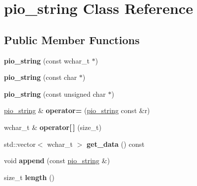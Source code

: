 \hypertarget{classpio__string}{
\section{pio\_\-string Class Reference}
\label{classpio__string}
}
\subsection*{Public Member Functions}
\begin{DoxyCompactItemize}
\item 
\hypertarget{classpio__string_a9bd0f5f40db3f65faf17078584dfc7c0}{
{\bfseries pio\_\-string} (const wchar\_\-t $\ast$)}
\label{classpio__string_a9bd0f5f40db3f65faf17078584dfc7c0}

\item 
\hypertarget{classpio__string_a421efc512a30212f57d3255b199b0436}{
{\bfseries pio\_\-string} (const char $\ast$)}
\label{classpio__string_a421efc512a30212f57d3255b199b0436}

\item 
\hypertarget{classpio__string_ab72437ecfba5b07f3d429adf3f4af999}{
{\bfseries pio\_\-string} (const unsigned char $\ast$)}
\label{classpio__string_ab72437ecfba5b07f3d429adf3f4af999}

\item 
\hypertarget{classpio__string_a22cee63eb6600e417145545ca2c9a62b}{
\hyperlink{classpio__string}{pio\_\-string} \& {\bfseries operator=} (\hyperlink{classpio__string}{pio\_\-string} const \&r)}
\label{classpio__string_a22cee63eb6600e417145545ca2c9a62b}

\item 
\hypertarget{classpio__string_a99e604dfe190fdf79c2374bc16f1d6cf}{
wchar\_\-t \& {\bfseries operator\mbox{[}$\,$\mbox{]}} (size\_\-t)}
\label{classpio__string_a99e604dfe190fdf79c2374bc16f1d6cf}

\item 
\hypertarget{classpio__string_a9842f10a7044bad535a05c4db3926c2c}{
std::vector$<$ wchar\_\-t $>$ {\bfseries get\_\-data} () const }
\label{classpio__string_a9842f10a7044bad535a05c4db3926c2c}

\item 
\hypertarget{classpio__string_abbb6e15965eb055be7ca234b6bf11b2a}{
void {\bfseries append} (const \hyperlink{classpio__string}{pio\_\-string} \&)}
\label{classpio__string_abbb6e15965eb055be7ca234b6bf11b2a}

\item 
\hypertarget{classpio__string_aebdae04024c8bb5ab162b7b01648a94a}{
size\_\-t {\bfseries length} ()}
\label{classpio__string_aebdae04024c8bb5ab162b7b01648a94a}


\end{DoxyCompactItemize}
